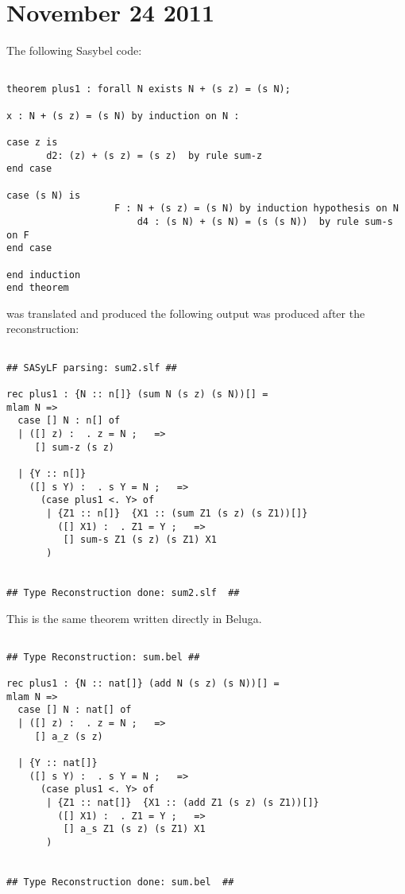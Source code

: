 \documentclass[12pt]{article}
\begin{document}
\section{November 24 2011}
The following \textmd{Sasybel} code:
\begin{verbatim}

theorem plus1 : forall N exists N + (s z) = (s N);

x : N + (s z) = (s N) by induction on N :

case z is
	   d2: (z) + (s z) = (s z) 	by rule sum-z
end case

case (s N) is
	               F : N + (s z) = (s N) by induction hypothesis on N
                       d4 : (s N) + (s N) = (s (s N))  by rule sum-s on F
end case

end induction
end theorem

\end{verbatim}
was translated and produced the following output was produced after the reconstruction:
\begin{verbatim}

## SASyLF parsing: sum2.slf ##

rec plus1 : {N :: n[]} (sum N (s z) (s N))[] =
mlam N =>
  case [] N : n[] of
  | ([] z) :  . z = N ;   =>
     [] sum-z (s z)

  | {Y :: n[]}
    ([] s Y) :  . s Y = N ;   =>
      (case plus1 <. Y> of
       | {Z1 :: n[]}  {X1 :: (sum Z1 (s z) (s Z1))[]}
         ([] X1) :  . Z1 = Y ;   =>
          [] sum-s Z1 (s z) (s Z1) X1
       )


## Type Reconstruction done: sum2.slf  ##

\end{verbatim}
This is the same theorem written directly in \textmd{Beluga}.
\begin{verbatim}

## Type Reconstruction: sum.bel ##

rec plus1 : {N :: nat[]} (add N (s z) (s N))[] =
mlam N =>
  case [] N : nat[] of
  | ([] z) :  . z = N ;   =>
     [] a_z (s z)

  | {Y :: nat[]}
    ([] s Y) :  . s Y = N ;   =>
      (case plus1 <. Y> of
       | {Z1 :: nat[]}  {X1 :: (add Z1 (s z) (s Z1))[]}
         ([] X1) :  . Z1 = Y ;   =>
          [] a_s Z1 (s z) (s Z1) X1
       )


## Type Reconstruction done: sum.bel  ##
\end{verbatim}
\end{document}
